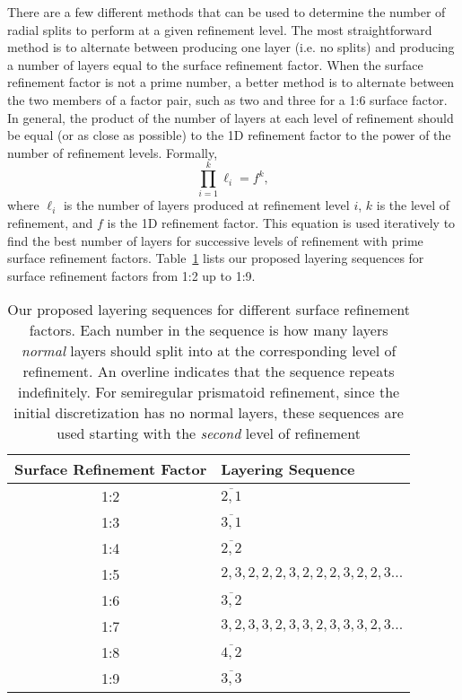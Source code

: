 There are a few different methods that can be used to determine the number of radial splits to perform at a given refinement level.
The most straightforward method is to alternate between producing one layer (i.e.
no splits) and producing a number of layers equal to the surface refinement factor.
When the surface refinement factor is not a prime number, a better method is to alternate between the two members of a factor pair, such as two and three for a 1:6 surface factor.
In general, the product of the number of layers at each level of refinement should be equal (or as close as possible) to the 1D refinement factor to the power of the number of refinement levels.
Formally,
%
\begin{equation*}
\prod_{i = 1}^{k} \ell_{i} = f^{k},
\end{equation*}
%
where $\ell_{i}$ is the number of layers produced at refinement level $i$, $k$ is the level of refinement, and $f$ is the 1D refinement factor.
This equation is used iteratively to find the best number of layers for successive levels of refinement with prime surface refinement factors.
Table~\ref{tab:layers} lists our proposed layering sequences for surface refinement factors from 1:2 up to 1:9.


\begin{table}[htp!]
	\centering
	\caption[Layering sequences for different surface refinement factors]{
		Our proposed layering sequences for different surface refinement factors.
		Each number in the sequence is how many layers \textit{normal} layers should split into at the corresponding level of refinement.
		An overline indicates that the sequence repeats indefinitely.
		For semiregular prismatoid refinement, since the initial discretization has no normal layers, these sequences are used starting with the \textit{second} level of refinement
	}
	\begin{tabular}{@{} c l @{}}
		\toprule
		Surface Refinement Factor & Layering Sequence         \\ \midrule
		1:2                  & $\overline{2,1}$               \\
		1:3                  & $\overline{3,1}$               \\
		1:4                  & $\overline{2,2}$               \\
		1:5                  & $2,3,2,2,2,3,2,2,2,3,2,2,3...$ \\
		1:6                  & $\overline{3,2}$               \\
		1:7                  & $3,2,3,3,2,3,3,2,3,3,3,2,3...$ \\
		1:8                  & $\overline{4,2}$               \\
		1:9                  & $\overline{3,3}$               \\ \bottomrule
	\end{tabular}
	\label{tab:layers}
\end{table}


